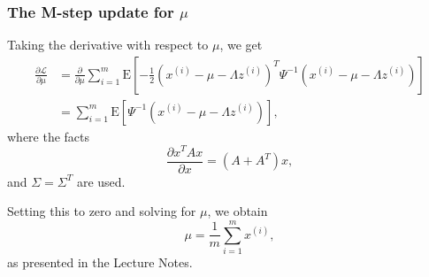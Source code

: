 \documentclass{article}
\begin{document}
\subsubsection{The M-step update for $\mu$}
Taking the derivative with respect to $\mu$, we get
\[
\begin{split}
\frac{\partial \mathcal{L}}{\partial\mu}
&=\frac{\partial }{\partial\mu}
\sum_{i=1}^m \text{E}\left[-\frac{1}{2}(x^{(i)}-\mu-\Lambda z^{(i)})^T\Psi^{-1}(x^{(i)}-\mu-\Lambda z^{(i)})\right]\\
&=\sum_{i=1}^m \text{E}\left[\Psi^{-1}(x^{(i)}-\mu-\Lambda z^{(i)})\right],
\end{split}
\]
where the facts
\[
\frac{\partial{x^TAx}}{\partial{x}}=(A+A^T)x,
\]
and $\Sigma=\Sigma^T$ are used.

Setting this to zero and solving for $\mu$, we obtain
\[
\mu=\frac{1}{m}\sum_{i=1}^m x^{(i)},
\]
as presented in the Lecture Notes.
\end{document}
